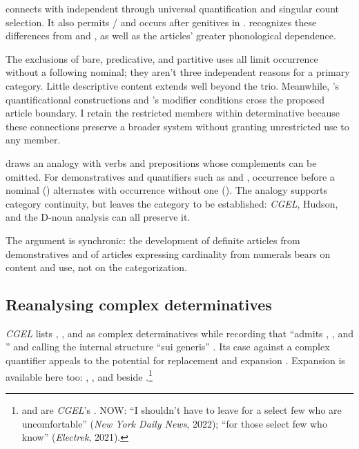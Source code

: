 \documentclass[12pt]{article}
\begin{document}
 connects with independent  through universal quantification and singular count selection. It also permits / and occurs after genitives in . \textcite[156--158]{spinillo2004reconceptualising} recognizes these differences from  and , as well as the articles' greater phonological dependence.

The exclusions of bare, predicative, and partitive uses all limit occurrence without a following nominal; they aren't three independent reasons for a primary category. Little descriptive content extends well beyond the trio. Meanwhile, 's quantificational constructions and 's modifier conditions cross the proposed article boundary. I retain the restricted members within determinative because these connections preserve a broader system without granting unrestricted use to any member.

\textcite[140--144]{spinillo2004reconceptualising} draws an analogy with verbs and prepositions whose complements can be omitted. For demonstratives and quantifiers such as  and , occurrence before a nominal () alternates with occurrence without one (). The analogy supports category continuity, but leaves the category to be established: \textit{CGEL}, Hudson, and the D-noun analysis can all preserve it.

The argument is synchronic: the development of definite articles from demonstratives and of articles expressing cardinality from numerals \citep[331--336]{lyons1999} bears on content and use, not on the categorization.

\subsection{Reanalysing complex determinatives}\label{sec:complex-determinatives}

\textit{CGEL} lists , , and  as complex determinatives while recording that  \enquote{admits , , and } and calling the internal structure \enquote{sui generis} \citep[392, 394]{huddleston2002}. Its case against a complex quantifier  appeals to the potential for replacement and expansion \citep[351--352]{huddleston2002}. Expansion is available here too: , , and  beside .\footnote{ and  are \textit{CGEL}'s \citep[392]{huddleston2002}. NOW: \enquote{I shouldn't have to leave for a select few who are uncomfortable} (\textit{New York Daily News}, 2022); \enquote{for those select few who know} (\textit{Electrek}, 2021).}
\end{document}
